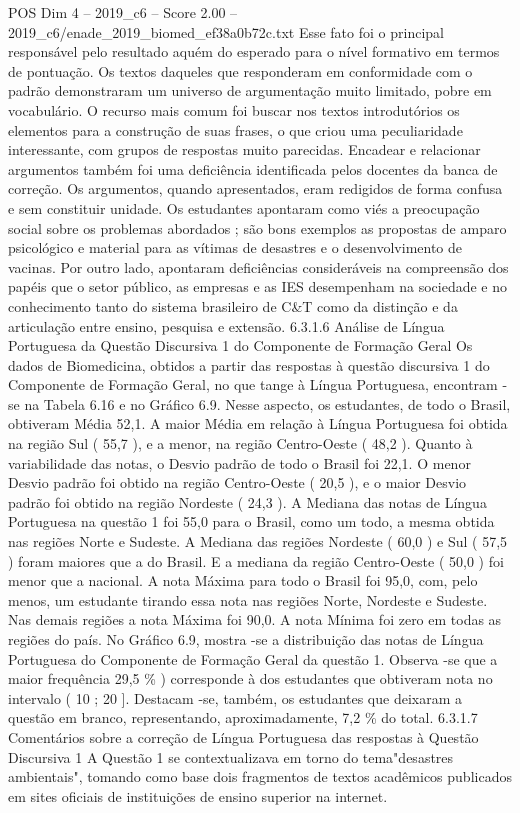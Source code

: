 \begin{textsample}{POS Dim 4 – 2019\_c6 – Score 2.00 – 2019\_c6/enade\_2019\_biomed\_ef38a0b72c.txt}
Esse fato foi o principal responsável pelo resultado aquém do esperado para o nível formativo em termos de pontuação.
Os textos daqueles que responderam em conformidade com o padrão demonstraram um universo de argumentação muito limitado, pobre em vocabulário.
O recurso mais comum foi buscar nos textos introdutórios os elementos para a construção de suas frases, o que criou uma peculiaridade interessante, com grupos de respostas muito parecidas.
Encadear e relacionar argumentos também foi uma deficiência identificada pelos docentes da banca de correção.
Os argumentos, quando apresentados, eram redigidos de forma confusa e sem constituir unidade.
Os estudantes apontaram como viés a preocupação social sobre os problemas abordados ; são bons exemplos as propostas de amparo psicológico e material para as vítimas de desastres e o desenvolvimento de vacinas.
Por outro lado, apontaram deficiências consideráveis na compreensão dos papéis que o setor público, as empresas e as IES desempenham na sociedade e no conhecimento tanto do sistema brasileiro de C\&T como da distinção e da articulação entre ensino, pesquisa e extensão. 6.3.1.6 Análise de Língua Portuguesa da Questão Discursiva 1 do Componente de Formação Geral Os dados de Biomedicina, obtidos a partir das respostas à questão discursiva 1 do Componente de Formação Geral, no que tange à Língua Portuguesa, encontram -se na Tabela 6.16 e no Gráfico 6.9.
Nesse aspecto, os estudantes, de todo o Brasil, obtiveram Média 52,1.
A maior Média em relação à Língua Portuguesa foi obtida na região Sul ( 55,7 ), e a menor, na região Centro-Oeste ( 48,2 ).
Quanto à variabilidade das notas, o Desvio padrão de todo o Brasil foi 22,1.
O menor Desvio padrão foi obtido na região Centro-Oeste ( 20,5 ), e o maior Desvio padrão foi obtido na região Nordeste ( 24,3 ).
A Mediana das notas de Língua Portuguesa na questão 1 foi 55,0 para o Brasil, como um todo, a mesma obtida nas regiões Norte e Sudeste.
A Mediana das regiões Nordeste ( 60,0 ) e Sul ( 57,5 ) foram maiores que a do Brasil.
E a mediana da região Centro-Oeste ( 50,0 ) foi menor que a nacional.
A nota Máxima para todo o Brasil foi 95,0, com, pelo menos, um estudante tirando essa nota nas regiões Norte, Nordeste e Sudeste.
Nas demais regiões a nota Máxima foi 90,0.
A nota Mínima foi zero em todas as regiões do país.
No Gráfico 6.9, mostra -se a distribuição das notas de Língua Portuguesa do Componente de Formação Geral da questão 1.
Observa -se que a maior frequência 29,5 \% ) corresponde à dos estudantes que obtiveram nota no intervalo ( 10 ; 20 ].
Destacam -se, também, os estudantes que deixaram a questão em branco, representando, aproximadamente, 7,2 \% do total. 6.3.1.7 Comentários sobre a correção de Língua Portuguesa das respostas à Questão Discursiva 1 A Questão 1 se contextualizava em torno do tema"desastres ambientais", tomando como base dois fragmentos de textos acadêmicos publicados em sites oficiais de instituições de ensino superior na internet.

\end{textsample}
